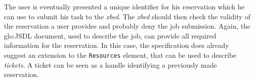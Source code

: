 The user is  eventually presented a unique identifier  for his reservation
which he  can use to submit  his task to the  \emph{xbed}. The \emph{xbed}
should  then check the  validity of  the reservation  a user  provides and
probably deny the job submission. Again, the \gls{glo:JSDL} document, used
to  describe  the  job,  can  provide all  required  information  for  the
reservation.   In this  case, the  specification does  already  suggest an
extension to the \texttt{Resources} element,  that can be used to describe
\emph{tickets}. A ticket can be  seen as a handle identifying a previously
made reservation.

